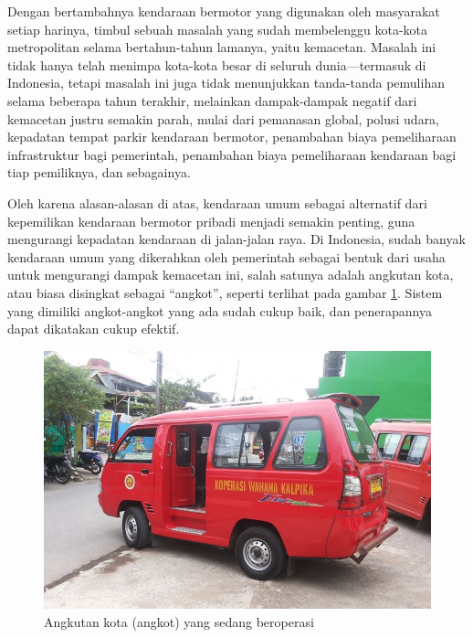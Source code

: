 \documentclass[a4paper,twoside]{article}
\begin{document}
Dengan bertambahnya kendaraan bermotor yang digunakan oleh masyarakat setiap harinya, timbul sebuah masalah yang sudah membelenggu kota-kota metropolitan selama bertahun-tahun lamanya, yaitu kemacetan. Masalah ini tidak hanya telah menimpa kota-kota besar di seluruh dunia---termasuk di Indonesia, tetapi masalah ini juga tidak menunjukkan tanda-tanda pemulihan selama beberapa tahun terakhir, melainkan dampak-dampak negatif dari kemacetan justru semakin parah, mulai dari pemanasan global, polusi udara, kepadatan tempat parkir kendaraan bermotor, penambahan biaya pemeliharaan infrastruktur bagi pemerintah, penambahan biaya pemeliharaan kendaraan bagi tiap pemiliknya, dan sebagainya.

Oleh karena alasan-alasan di atas, kendaraan umum sebagai alternatif dari kepemilikan kendaraan bermotor pribadi menjadi semakin penting, guna mengurangi kepadatan kendaraan di jalan-jalan raya. Di Indonesia, sudah banyak kendaraan umum yang dikerahkan oleh pemerintah sebagai bentuk dari usaha untuk mengurangi dampak kemacetan ini, salah satunya adalah angkutan kota, atau biasa disingkat sebagai ``angkot'', seperti terlihat pada gambar \ref{fig:angkot}. Sistem yang dimiliki angkot-angkot yang ada sudah cukup baik, dan penerapannya dapat dikatakan cukup efektif. 

\begin{figure}[H]
	\centering
	\includegraphics[scale=0.3]{angkot}
	\caption[Angkot yang sedang beroperasi]{Angkutan kota (angkot) yang sedang beroperasi}
	\label{fig:angkot}
\end{figure}
\end{document}
